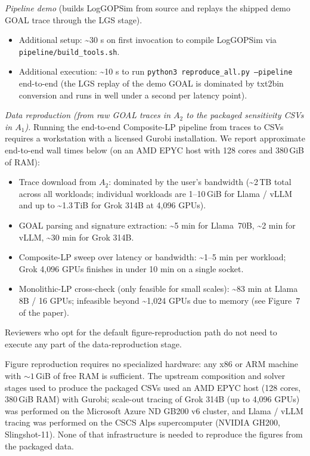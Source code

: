 \documentclass[conference]{IEEEtran}
\begin{document}
\emph{Pipeline demo} (builds LogGOPSim from source and replays the
shipped demo GOAL trace through the LGS stage).

\begin{itemize}
\item Additional setup: \textasciitilde30 s on first invocation to
  compile LogGOPSim via \texttt{pipeline/build\_tools.sh}.
\item Additional execution: \textasciitilde10 s to run
  \texttt{python3 reproduce\_all.py --pipeline} end-to-end (the
  LGS replay of the demo GOAL is dominated by txt2bin conversion
  and runs in well under a second per latency point).
\end{itemize}

\emph{Data reproduction (from raw GOAL traces in $A_2$ to the
packaged sensitivity CSVs in $A_1$).} Running the end-to-end
Composite-LP pipeline from traces to CSVs requires a workstation
with a licensed Gurobi installation. We report approximate
end-to-end wall times below (on an AMD EPYC host with 128 cores and
380\,GiB of RAM):

\begin{itemize}
\item Trace download from $A_2$: dominated by the user's bandwidth
  (\textasciitilde 2\,TB total across all workloads; individual
  workloads are 1--10\,GiB for Llama / vLLM and up to
  \textasciitilde 1.3\,TiB for Grok 314B at 4{,}096 GPUs).
\item GOAL parsing and signature extraction: \textasciitilde 5 min for
  Llama~70B, \textasciitilde 2 min for vLLM, \textasciitilde 30 min
  for Grok 314B.
\item Composite-LP sweep over latency or bandwidth:
  \textasciitilde 1--5 min per workload; Grok 4{,}096 GPUs finishes
  in under 10 min on a single socket.
\item Monolithic-LP cross-check (only feasible for small scales):
  \textasciitilde 83 min at Llama 8B / 16 GPUs; infeasible beyond
  \textasciitilde 1{,}024 GPUs due to memory (see Figure~7 of the
  paper).
\end{itemize}

Reviewers who opt for the default figure-reproduction path do not
need to execute any part of the data-reproduction stage.

\artin


Figure reproduction requires no specialized hardware: any x86 or
ARM machine with ${\sim}1$\,GiB of free RAM is sufficient. The
upstream composition and solver stages used to produce the packaged
CSVs used an AMD EPYC host (128 cores, 380\,GiB RAM) with Gurobi;
scale-out tracing of Grok 314B (up to 4{,}096 GPUs) was performed on
the Microsoft Azure ND GB200 v6 cluster, and Llama / vLLM tracing
was performed on the CSCS Alps supercomputer (NVIDIA GH200,
Slingshot-11). None of that infrastructure is needed to reproduce
the figures from the packaged data.
\end{document}
